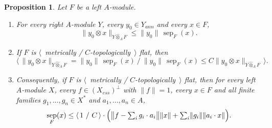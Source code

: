 \documentclass[11pt]{article}
\theoremstyle{plain}
\newtheorem{proposition}[theorem]{Proposition}
\theoremstyle{definition}
\newcommand{\projmodtens}[1]{\mathbin{\widehat{\otimes}}_{#1}}
\DeclareMathOperator{\sep}{sep}
\begin{document}
\begin{proposition}\label{SepViaAnnihVector}
Let $F$ be a left $A$-module.
\begin{enumerate}[label = (\roman*)]
\item For every right $A$-module $Y$, every $y_0\in Y_{ann}$ and every $x\in F$,
\[
\lVert y_0\otimes x\rVert_{Y\projmodtens{A}F}\leq\lVert y_0\rVert\,\sep_F(x).
\]

\item If $F$ is $\langle$~metrically / $C$-topologically~$\rangle$ flat, then
\[
\bigl\langle\,
\lVert y_0\otimes x\rVert_{Y\projmodtens{A}F}=\lVert y_0\rVert\,\sep_F(x)
\ /\
\lVert y_0\rVert\,\sep_F(x)\leq C\lVert y_0\otimes x\rVert_{Y\projmodtens{A}F}
\,\bigr\rangle .
\]

\item Consequently, if $F$ is $\langle$~metrically / $C$-topologically~$\rangle$
flat, then for every left $A$-module $X$, every $f\in{(X_{ess})}^\perp$ with
$\lVert f\rVert=1$, every $x\in F$ and all finite families
$g_1,\dots,g_n\in X^*$ and $a_1,\dots,a_n\in A$,
\[
\sep_F(x)\leq\langle\,1\ /\ C\,\rangle\cdot \Bigl(
  \bigl\lVert f-\textstyle\sum_i g_i\cdot a_i\bigr\rVert\lVert x\rVert
  +\textstyle\sum_i\lVert g_i\rVert\lVert a_i\cdot x\rVert
 \Bigr).
\]
\end{enumerate}
\end{proposition}
\end{document}
